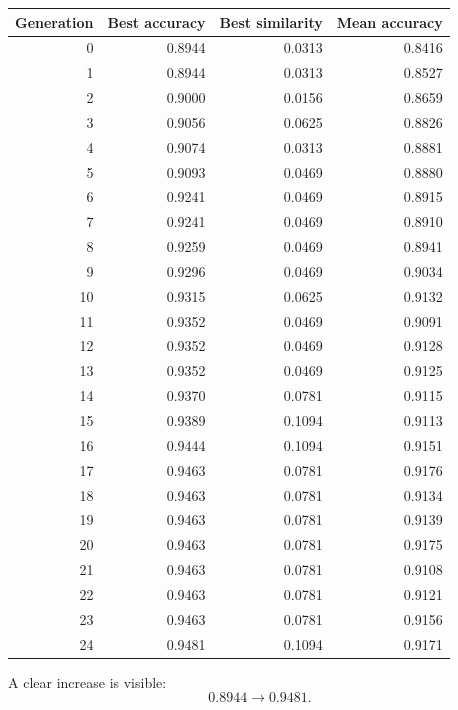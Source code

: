 \begin{center}
\begin{tabular}{rrrr}
\toprule
Generation & Best accuracy & Best similarity & Mean accuracy \\
\midrule
0 & 0.8944 & 0.0313 & 0.8416 \\
1 & 0.8944 & 0.0313 & 0.8527 \\
2 & 0.9000 & 0.0156 & 0.8659 \\
3 & 0.9056 & 0.0625 & 0.8826 \\
4 & 0.9074 & 0.0313 & 0.8881 \\
5 & 0.9093 & 0.0469 & 0.8880 \\
6 & 0.9241 & 0.0469 & 0.8915 \\
7 & 0.9241 & 0.0469 & 0.8910 \\
8 & 0.9259 & 0.0469 & 0.8941 \\
9 & 0.9296 & 0.0469 & 0.9034 \\
10 & 0.9315 & 0.0625 & 0.9132 \\
11 & 0.9352 & 0.0469 & 0.9091 \\
12 & 0.9352 & 0.0469 & 0.9128 \\
13 & 0.9352 & 0.0469 & 0.9125 \\
14 & 0.9370 & 0.0781 & 0.9115 \\
15 & 0.9389 & 0.1094 & 0.9113 \\
16 & 0.9444 & 0.1094 & 0.9151 \\
17 & 0.9463 & 0.0781 & 0.9176 \\
18 & 0.9463 & 0.0781 & 0.9134 \\
19 & 0.9463 & 0.0781 & 0.9139 \\
20 & 0.9463 & 0.0781 & 0.9175 \\
21 & 0.9463 & 0.0781 & 0.9108 \\
22 & 0.9463 & 0.0781 & 0.9121 \\
23 & 0.9463 & 0.0781 & 0.9156 \\
24 & 0.9481 & 0.1094 & 0.9171 \\
\bottomrule
\end{tabular}
\end{center}

A clear increase is visible:
\[
0.8944\to 0.9481.
\]
